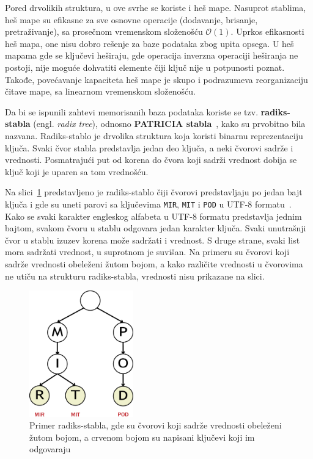 \documentclass[12pt,oneside]{memoir}
\begin{document}
Pored drvolikih struktura, u ove svrhe se koriste i heš mape. Nasuprot
stablima, heš mape su efikasne za sve osnovne operacije (dodavanje, brisanje, pretraživanje),
sa prosečnom vremenskom složenošću $ \mathcal{O}(1) $. Uprkos efikasnosti heš mapa, one nisu
dobro rešenje za baze podataka zbog upita opsega. U heš mapama gde se ključevi heširaju,
gde operacija inverzna operaciji heširanja ne postoji, nije moguće dohvatiti
elemente čiji ključ nije u potpunosti poznat.
Takođe, povećavanje kapaciteta heš mape je skupo i podrazumeva reorganizaciju
čitave mape, sa linearnom vremenskom složenošću.

Da bi se ispunili zahtevi memorisanih baza podataka koriste se tzv.
\textbf{radiks-stabla} (engl. \emph{radix tree}), odnosno
\textbf{PATRICIA stabla}~\cite{patricia}, kako su prvobitno bila nazvana.
Radiks-stablo je drvolika struktura koja koristi binarnu reprezentaciju ključa.
Svaki čvor stabla predstavlja jedan deo ključa, a neki čvorovi
sadrže i vrednosti. Posmatrajući put od korena do čvora koji
sadrži vrednost dobija se ključ koji je uparen sa tom
vrednošću.

Na slici~\ref{fig:radix} predstavljeno je radiks-stablo
čiji čvorovi predstavljaju po jedan bajt ključa i gde su uneti parovi sa
ključevima \texttt{MIR}, \texttt{MIT} i \texttt{POD} u
UTF-8 formatu~\cite{unicode}.
Kako se svaki karakter engleskog alfabeta u UTF-8 formatu predstavlja
jednim bajtom, svakom čvoru u stablu odgovara jedan karakter
ključa. Svaki unutrašnji čvor u stablu izuzev korena može sadržati i vrednost.
S druge strane, svaki list mora sadržati vrednost, u suprotnom je suvišan.
Na primeru su čvorovi koji sadrže vrednosti obeleženi žutom bojom,
a kako različite vrednosti u čvorovima ne utiču na strukturu
radiks-stabla, vrednosti nisu prikazane na slici.

\begin{figure}[!h]
  \centering
  \includegraphics[width=0.40\textwidth]{radix_tree.eps}
  \caption{Primer radiks-stabla, gde su čvorovi koji sadrže vrednosti
    obeleženi žutom bojom, a crvenom bojom su napisani ključevi koji im
    odgovaraju}
  \label{fig:radix}
\end{figure}
\end{document}
